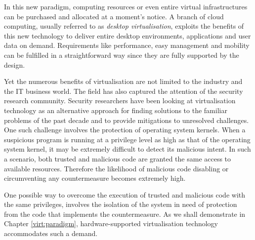 In this new paradigm, computing resources or even entire virtual infrastructures can be purchased and allocated at a moment's notice. A branch of cloud computing, usually referred to as \emph{desktop virtualisation}, exploits the benefits of this new technology to deliver entire desktop environments, applications and user data on demand. Requirements like performance, easy management and mobility can be fulfilled in a straightforward way since they are fully supported by the design.

Yet the numerous benefits of virtualisation are not limited to the industry and the IT business world. The field has also captured the attention of the security research community.
Security researchers have been looking at virtualisation technology as an alternative approach for finding solutions to the familiar problems of the past decade and to provide mitigations to unresolved challenges.
One such challenge involves the protection of operating system kernels. When a suspicious program is running at a privilege level as high as that of the operating system kernel, it may be extremely difficult to detect its malicious intent. 
In such a scenario, both trusted and malicious code are granted the same access to available resources. Therefore the likelihood of malicious code disabling or circumventing any countermeasure becomes extremely high.


One possible way to overcome the execution of trusted and malicious code with the same privileges, involves the isolation of the system in need of protection from the code that implements the countermeasure. As we shall demonstrate  in Chapter \ref{virt:paradigm}, hardware-supported virtualisation technology accommodates such a demand. 


